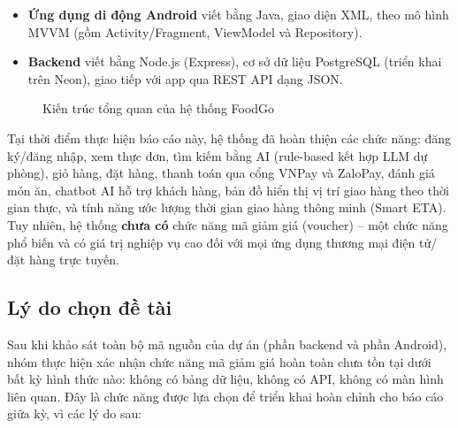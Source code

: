 \documentclass[12pt,a4paper]{article}
\begin{document}
\begin{itemize}[leftmargin=*]
    \item \textbf{Ứng dụng di động Android} viết bằng Java, giao diện XML, theo mô hình MVVM (gồm Activity/Fragment, ViewModel và Repository).
    \item \textbf{Backend} viết bằng Node.js (Express), cơ sở dữ liệu PostgreSQL (triển khai trên Neon), giao tiếp với app qua REST API dạng JSON.
\end{itemize}

\begin{figure}[H]
\centering
{}
\caption{Kiến trúc tổng quan của hệ thống FoodGo}
\end{figure}

Tại thời điểm thực hiện báo cáo này, hệ thống đã hoàn thiện các chức năng: đăng ký/đăng nhập, xem thực đơn, tìm kiếm bằng AI (rule-based kết hợp LLM dự phòng), giỏ hàng, đặt hàng, thanh toán qua cổng VNPay và ZaloPay, đánh giá món ăn, chatbot AI hỗ trợ khách hàng, bản đồ hiển thị vị trí giao hàng theo thời gian thực, và tính năng ước lượng thời gian giao hàng thông minh (Smart ETA). Tuy nhiên, hệ thống \textbf{chưa có} chức năng mã giảm giá (voucher) -- một chức năng phổ biến và có giá trị nghiệp vụ cao đối với mọi ứng dụng thương mại điện tử/đặt hàng trực tuyến.

\subsection{Lý do chọn đề tài}

Sau khi khảo sát toàn bộ mã nguồn của dự án (phần backend và phần Android), nhóm thực hiện xác nhận chức năng mã giảm giá hoàn toàn chưa tồn tại dưới bất kỳ hình thức nào: không có bảng dữ liệu, không có API, không có màn hình liên quan. Đây là chức năng được lựa chọn để triển khai hoàn chỉnh cho báo cáo giữa kỳ, vì các lý do sau:
\end{document}
